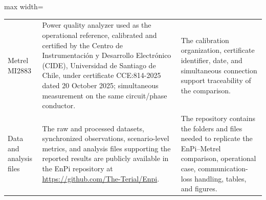 \documentclass[technologies,article,submit,pdftex,moreauthors]{Definitions/mdpi}
\begin{document}
\begin{table}[H]
\begin{adjustbox}{max width=\textwidth}
\begin{tabular}{p{}p{}p{}}
Metrel MI2883 & Power quality analyzer used as the operational reference, calibrated and certified by the Centro de Instrumentaci\'on y Desarrollo Electr\'onico (CIDE), Universidad de Santiago de Chile, under certificate CCE:814-2025 dated 20 October 2025; simultaneous measurement on the same circuit/phase conductor. & The calibration organization, certificate identifier, date, and simultaneous connection support traceability of the comparison. \\
Data and analysis files & The raw and processed datasets, synchronized observations, scenario-level metrics, and analysis files supporting the reported results are publicly available in the EnPi repository at \url{https://github.com/The-Terial/Enpi}. & The repository contains the folders and files needed to replicate the EnPi--Metrel comparison, operational case, communication-loss handling, tables, and figures. \\
\bottomrule
\end{tabular}
\end{adjustbox}
\end{table}
\FloatBarrier
\end{document}
